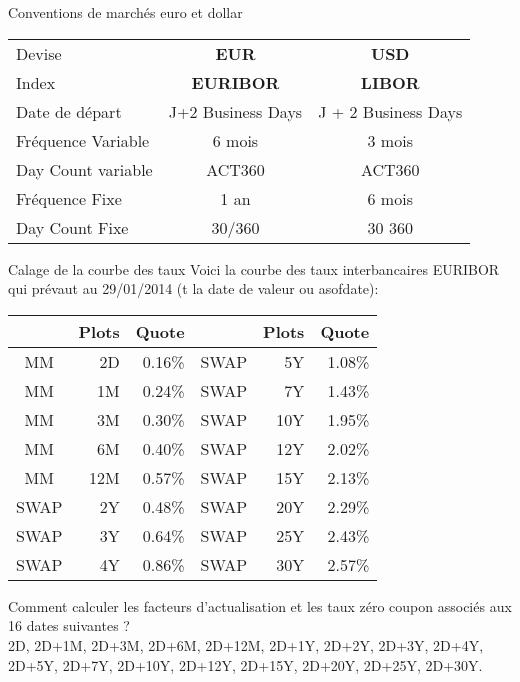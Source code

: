 \documentclass{beamer}
\begin{document}
\begin{frame}{Conventions de marchés euro et dollar}
\begin{center}
\begin{tabular}{|l|c|c|}
\hline
Devise&\textbf{EUR}&\textbf{USD}\\
Index&\textbf{EURIBOR}&\textbf{LIBOR} \\
\hline
Date de départ& J+2 Business Days&J + 2 Business Days \\
Fréquence Variable&6 mois&3 mois\\
Day Count variable&ACT360&ACT360\\
Fréquence Fixe&1 an&6 mois\\
Day Count Fixe&30/360&30 360\\
\hline
\end{tabular}
\end{center}
\end{frame}

\begin{frame}{Calage de la courbe des taux}
Voici la courbe des taux interbancaires EURIBOR qui prévaut au 29/01/2014 (t la date de valeur ou asofdate):

\begin{center}
\begin{tabular}{|c|r|r|c|r|r|}
  \hline
  & Plots & Quote & & Plots & Quote \\
  \hline
  MM & 2D & 0.16\% & SWAP & 5Y & 1.08\%\\
  MM & 1M & 0.24\% & SWAP & 7Y & 1.43\%\\
  MM & 3M & 0.30\% & SWAP & 10Y & 1.95\%\\
  MM & 6M & 0.40\% & SWAP & 12Y & 2.02\%\\
  MM & 12M & 0.57\% & SWAP & 15Y & 2.13\%\\
  SWAP & 2Y & 0.48\% & SWAP & 20Y & 2.29\%\\
  SWAP & 3Y & 0.64\% & SWAP & 25Y & 2.43\%\\
  SWAP & 4Y & 0.86\% & SWAP & 30Y & 2.57\%\\
  \hline
\end{tabular}
\end{center}
Comment calculer les facteurs d'actualisation et les taux zéro coupon associés aux 16 dates suivantes ? \\
2D, 2D+1M, 2D+3M, 2D+6M, 2D+12M, 2D+1Y, 2D+2Y, 2D+3Y, 2D+4Y, 2D+5Y, 2D+7Y, 2D+10Y, 2D+12Y, 2D+15Y, 2D+20Y, 2D+25Y, 2D+30Y.
\end{frame}
\end{document}
